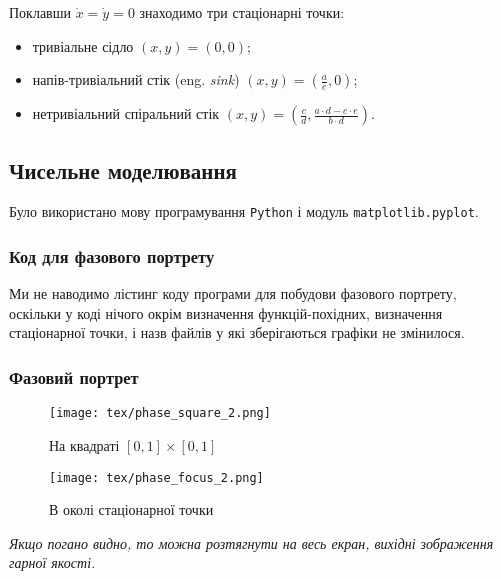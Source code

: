 Поклавши $\dot x = \dot y = 0$ знаходимо три стаціонарні точки: 
\begin{itemize}
	\item тривіальне сідло $(x, y) = (0, 0)$;
	\item напів-тривіальний стік (eng. \textit{sink}) $(x, y) = \left( \frac{a}{e}, 0 \right)$;
	\item нетривіальний спіральний стік $(x, y) = \left(\frac{c}{d}, \frac{a \cdot d - c \cdot e}{b \cdot d}\right)$.
\end{itemize}

\newpage

\subsection{Чисельне моделювання}

Було використано мову програмування \texttt{Python} і модуль \texttt{matplotlib.pyplot}.

\subsubsection{Код для фазового портрету}

Ми не наводимо лістинг коду програми для побудови  фазового портрету, оскільки у коді нічого окрім визначення функцій-похідних, визначення стаціонарної точки, і назв файлів у які зберігаються графіки не змінилося.

\subsubsection{Фазовий портрет}

\begin{minipage}[t]{.5\textwidth}
	\begin{figure}[H]
		\centering
		\caption{На квадраті $[0, 1] \times [0, 1]$}
		\texttt{[image: tex/phase\_square\_2.png]}
	\end{figure}
\end{minipage}
\begin{minipage}[t]{.5\textwidth}
	\begin{figure}[H]
		\centering
		\caption{В околі стаціонарної точки}
		\texttt{[image: tex/phase\_focus\_2.png]}
	\end{figure}
\end{minipage}

\textit{Якщо погано видно, то можна розтягнути на весь екран, вихідні зображення гарної якості.} \medskip

